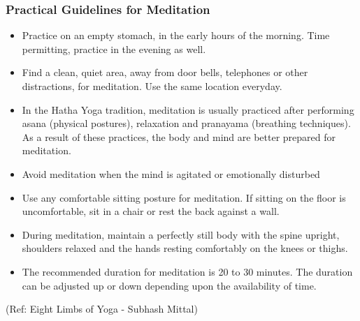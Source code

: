 \begin{frame}[fragile]\frametitle{Practical Guidelines for Meditation}


	\begin{itemize}
	\item Practice on an empty stomach, in the early hours of the 
morning. Time permitting, practice in the evening as well.
	\item Find a clean, quiet area, away from door bells, telephones or other 
distractions, for meditation. Use the same location everyday. 
	\item In the Hatha Yoga tradition, meditation is usually practiced after 
performing asana (physical postures), relaxation and pranayama
(breathing techniques). As a result of these practices, the body and mind 
are better prepared for meditation.
	\item  Avoid meditation when the mind is agitated or emotionally disturbed
	\item Use any comfortable sitting posture for meditation. If sitting on the floor is 
uncomfortable, sit in a chair or rest the back against a wall.
	\item  During meditation, maintain a perfectly still body with the spine upright, 
shoulders relaxed and the hands resting comfortably on the knees or 
thighs.
	\item  The recommended duration for meditation is 20 to 30 minutes. The 
duration can be adjusted up or down depending upon the availability of 
time.
	\end{itemize}

\tiny{(Ref: Eight Limbs of Yoga - Subhash Mittal)}

\end{frame}

